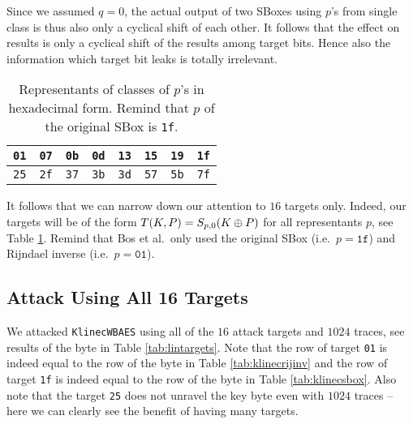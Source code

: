 \begin{remark}
\begin{description}
			Since we assumed $q = 0$, the actual output of two SBoxes using $p$'s from single class is thus also only a cyclical shift of each other. It follows that the effect on results is only a cyclical shift of the results among target bits. Hence also the information which target bit leaks is totally irrelevant.
	\end{description}
\end{remark}

\begin{table}[h]
	\begin{center}
	\begin{tabular}{| c | c | c | c | c | c | c | c |}
		\hline
		{\tt 01} & {\tt 07} & {\tt 0b} & {\tt 0d} & {\tt 13} & {\tt 15} & {\tt 19} & {\tt 1f} \\
		\hline
		{\tt 25} & {\tt 2f} & {\tt 37} & {\tt 3b} & {\tt 3d} & {\tt 57} & {\tt 5b} & {\tt 7f} \\
		\hline
	\end{tabular}
	\end{center}
\caption{Representants of classes of $p$'s in hexadecimal form. Remind that $p$ of the original SBox is {\tt 1f}.}
\label{tab:classrepre}
\end{table}

It follows that we can narrow down our attention to $16$ targets only. Indeed, our targets will be of the form $T(K,P) = S_{p,0}(K\oplus P)$ for all representants $p$, see Table \ref{tab:classrepre}. Remind that Bos et al.\ only used the original SBox (i.e.\ $p = \texttt{1f}$) and Rijndael inverse (i.e.\ $p = \texttt{01}$).



\subsection{Attack Using All 16 Targets}

We attacked {\tt KlinecWBAES} using all of the $16$ attack targets and $1024$ traces, see results of the  byte in Table \ref{tab:lintargets}. Note that the row of target {\tt 01} is indeed equal to the row of the  byte in Table \ref{tab:klinecrijinv} and the row of target {\tt 1f} is indeed equal to the row of the  byte in Table \ref{tab:klinecsbox}. Also note that the target {\tt 25} does not unravel the  key byte even with $1024$ traces -- here we can clearly see the benefit of having many targets.

